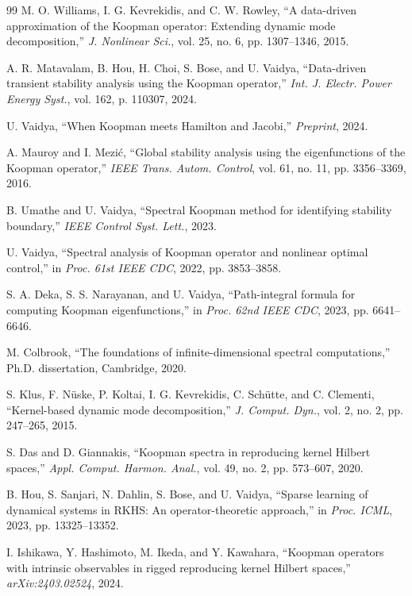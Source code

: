\documentclass[11pt,a4paper]{article}
\begin{document}
\begin{thebibliography}{99}
M. O. Williams, I. G. Kevrekidis, and C. W. Rowley, ``A data-driven approximation of the Koopman operator: Extending dynamic mode decomposition,'' \textit{J. Nonlinear Sci.}, vol. 25, no. 6, pp. 1307--1346, 2015.

A. R. Matavalam, B. Hou, H. Choi, S. Bose, and U. Vaidya, ``Data-driven transient stability analysis using the Koopman operator,'' \textit{Int. J. Electr. Power Energy Syst.}, vol. 162, p. 110307, 2024.

U. Vaidya, ``When Koopman meets Hamilton and Jacobi,'' \textit{Preprint}, 2024.

A. Mauroy and I. Mezi\'{c}, ``Global stability analysis using the eigenfunctions of the Koopman operator,'' \textit{IEEE Trans. Autom. Control}, vol. 61, no. 11, pp. 3356--3369, 2016.

B. Umathe and U. Vaidya, ``Spectral Koopman method for identifying stability boundary,'' \textit{IEEE Control Syst. Lett.}, 2023.

U. Vaidya, ``Spectral analysis of Koopman operator and nonlinear optimal control,'' in \textit{Proc. 61st IEEE CDC}, 2022, pp. 3853--3858.

S. A. Deka, S. S. Narayanan, and U. Vaidya, ``Path-integral formula for computing Koopman eigenfunctions,'' in \textit{Proc. 62nd IEEE CDC}, 2023, pp. 6641--6646.

M. Colbrook, ``The foundations of infinite-dimensional spectral computations,'' Ph.D. dissertation, Cambridge, 2020.

S. Klus, F. N\"{u}ske, P. Koltai, I. G. Kevrekidis, C. Sch\"{u}tte, and C. Clementi, ``Kernel-based dynamic mode decomposition,'' \textit{J. Comput. Dyn.}, vol. 2, no. 2, pp. 247--265, 2015.

S. Das and D. Giannakis, ``Koopman spectra in reproducing kernel Hilbert spaces,'' \textit{Appl. Comput. Harmon. Anal.}, vol. 49, no. 2, pp. 573--607, 2020.

B. Hou, S. Sanjari, N. Dahlin, S. Bose, and U. Vaidya, ``Sparse learning of dynamical systems in RKHS: An operator-theoretic approach,'' in \textit{Proc. ICML}, 2023, pp. 13325--13352.

I. Ishikawa, Y. Hashimoto, M. Ikeda, and Y. Kawahara, ``Koopman operators with intrinsic observables in rigged reproducing kernel Hilbert spaces,'' \textit{arXiv:2403.02524}, 2024.


\end{thebibliography}
\end{document}

